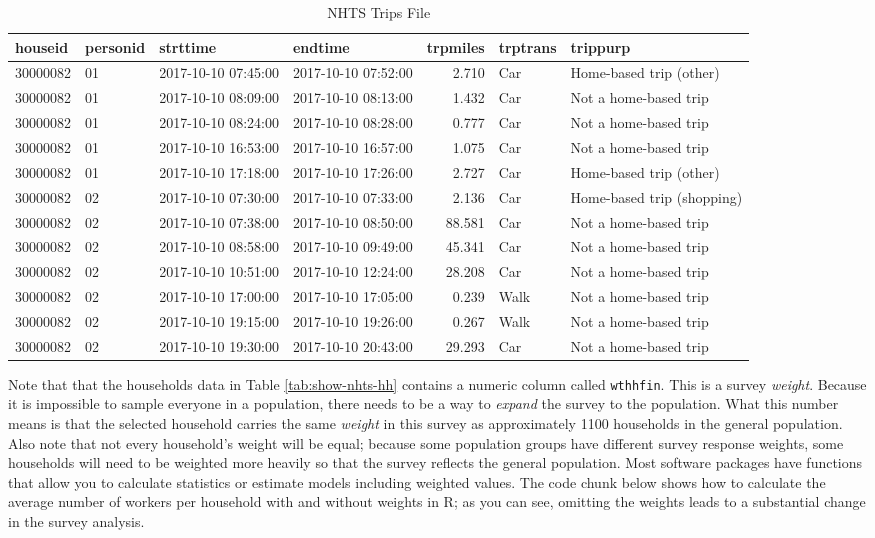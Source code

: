 \documentclass[
]{book}
\begin{document}
\begin{table}

\caption{\label{tab:show-nhts-trips}NHTS Trips File}
\centering
\begin{tabular}[t]{l|l|l|l|r|l|l}
\hline
houseid & personid & strttime & endtime & trpmiles & trptrans & trippurp\\
\hline
30000082 & 01 & 2017-10-10 07:45:00 & 2017-10-10 07:52:00 & 2.710 & Car & Home-based trip (other)\\
\hline
30000082 & 01 & 2017-10-10 08:09:00 & 2017-10-10 08:13:00 & 1.432 & Car & Not a home-based trip\\
\hline
30000082 & 01 & 2017-10-10 08:24:00 & 2017-10-10 08:28:00 & 0.777 & Car & Not a home-based trip\\
\hline
30000082 & 01 & 2017-10-10 16:53:00 & 2017-10-10 16:57:00 & 1.075 & Car & Not a home-based trip\\
\hline
30000082 & 01 & 2017-10-10 17:18:00 & 2017-10-10 17:26:00 & 2.727 & Car & Home-based trip (other)\\
\hline
30000082 & 02 & 2017-10-10 07:30:00 & 2017-10-10 07:33:00 & 2.136 & Car & Home-based trip (shopping)\\
\hline
30000082 & 02 & 2017-10-10 07:38:00 & 2017-10-10 08:50:00 & 88.581 & Car & Not a home-based trip\\
\hline
30000082 & 02 & 2017-10-10 08:58:00 & 2017-10-10 09:49:00 & 45.341 & Car & Not a home-based trip\\
\hline
30000082 & 02 & 2017-10-10 10:51:00 & 2017-10-10 12:24:00 & 28.208 & Car & Not a home-based trip\\
\hline
30000082 & 02 & 2017-10-10 17:00:00 & 2017-10-10 17:05:00 & 0.239 & Walk & Not a home-based trip\\
\hline
30000082 & 02 & 2017-10-10 19:15:00 & 2017-10-10 19:26:00 & 0.267 & Walk & Not a home-based trip\\
\hline
30000082 & 02 & 2017-10-10 19:30:00 & 2017-10-10 20:43:00 & 29.293 & Car & Not a home-based trip\\
\hline
\end{tabular}
\end{table}

Note that that the households data in Table \ref{tab:show-nhts-hh} contains a
numeric column called \texttt{wthhfin}. This is a survey \emph{weight}. Because it is impossible
to sample everyone in a population, there needs to be a way to \emph{expand} the survey
to the population. What this number means is that the selected household carries
the same \emph{weight} in this survey as approximately 1100 households in the general
population. Also note that not every household's weight will be equal; because
some population groups have different survey response weights, some households
will need to be weighted more heavily so that the survey reflects the general
population. Most software packages have functions that allow you to
calculate statistics or estimate models including weighted values. The code
chunk below shows how to calculate the average number of workers per household
with and without weights in R; as you can see, omitting the weights leads
to a substantial change in the survey analysis.
\end{document}
